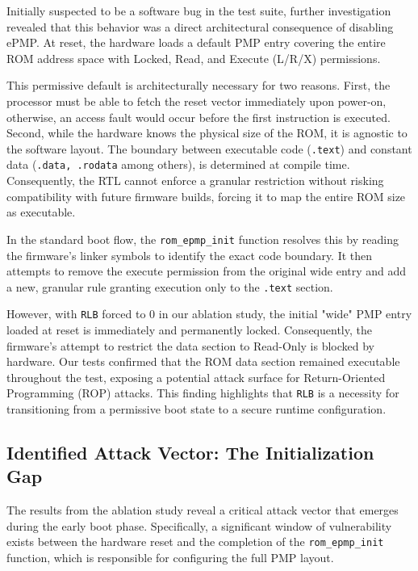 \documentclass[10pt,a4paper,twocolumn,twoside]{article}
\begin{document}
Initially suspected to be a software bug in the test suite, further investigation revealed that this behavior was a direct architectural consequence of disabling ePMP. At reset, the hardware loads a default PMP entry covering the entire ROM address space with Locked, Read, and Execute (L/R/X) permissions.

This permissive default is architecturally necessary for two reasons. First, the processor must be able to fetch the reset vector immediately upon power-on, otherwise, an access fault would occur before the first instruction is executed. Second, while the hardware knows the physical size of the ROM, it is agnostic to the software layout. The boundary between executable code (\texttt{.text}) and constant data (\texttt{.data, .rodata} among others), is determined at compile time. Consequently, the RTL cannot enforce a granular restriction without risking compatibility with future firmware builds, forcing it to map the entire ROM size as executable.

In the standard boot flow, the \texttt{rom\_epmp\_init} function resolves this by reading the firmware's linker symbols to identify the exact code boundary. It then attempts to remove the execute permission from the original wide entry and add a new, granular rule granting execution only to the \texttt{.text} section.

However, with \texttt{RLB} forced to 0 in our ablation study, the initial "wide" PMP entry loaded at reset is immediately and permanently locked. Consequently, the firmware's attempt to restrict the data section to Read-Only is blocked by hardware. Our tests confirmed that the ROM data section remained executable throughout the test, exposing a potential attack surface for Return-Oriented Programming (ROP) attacks. This finding highlights that \texttt{RLB} is a necessity for transitioning from a permissive boot state to a secure runtime configuration.

\subsection{Identified Attack Vector: The Initialization Gap}
The results from the ablation study reveal a critical attack vector that emerges during the early boot phase. Specifically, a significant window of vulnerability exists between the hardware reset and the completion of the \texttt{rom\_epmp\_init} function, which is responsible for configuring the full PMP layout.
\end{document}
